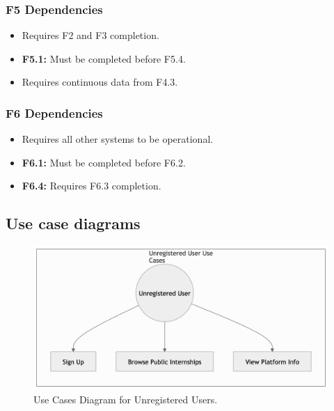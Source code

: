\subsubsection{F5 Dependencies}
\begin{itemize}
    \item Requires F2 and F3 completion.
    \item \textbf{F5.1:} Must be completed before F5.4.
    \item Requires continuous data from F4.3.
\end{itemize}

\subsubsection{F6 Dependencies}
\begin{itemize}
    \item Requires all other systems to be operational.
    \item \textbf{F6.1:} Must be completed before F6.2.
    \item \textbf{F6.4:} Requires F6.3 completion.
\end{itemize}

\newpage
\subsection{Use case diagrams}
\label{subsec:use_case_diagrams}%


\begin{figure}[H]
    \begin{center}
        \includegraphics[width=1\linewidth]{JhaBhatiaSharma/Images/Use Case Diagrams/UnregisteredUser.png}
        \caption{Use Cases Diagram for Unregistered Users.} 
        \label{fig:UnregisteredUC}%
    \end{center}
\end{figure}



